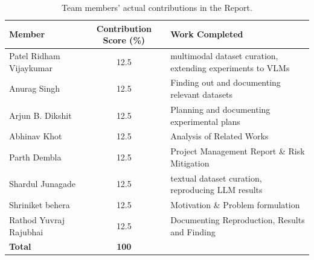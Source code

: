 \documentclass[11pt,a4paper]{article}
\begin{document}
\begin{table}[H]
\centering
\caption{Team members' actual contributions in the Report.}
\begin{tabularx}{\textwidth}{l c X}
\toprule
\textbf{Member} & Contribution Score (\%) & \textbf{Work Completed} \\
\midrule
Patel Ridham Vijaykumar & 12.5 &  multimodal dataset curation, extending experiments to VLMs \\
Anurag Singh &12.5 &  Finding out and documenting relevant datasets \\
Arjun B. Dikshit & 12.5 & Planning and documenting experimental plans \\
Abhinav Khot & 12.5 & Analysis of Related Works \\
Parth Dembla & 12.5 &  Project Management Report \& Risk Mitigation \\
Shardul Junagade & 12.5 & textual dataset curation, reproducing LLM results \\
Shriniket behera & 12.5 &  Motivation \& Problem formulation \\
Rathod Yuvraj Rajubhai & 12.5 &  Documenting Reproduction, Results and Finding \\

\midrule
\textbf{Total} & \textbf{100} & \\
\bottomrule
\end{tabularx}
\end{table}
\newpage



\end{document}

